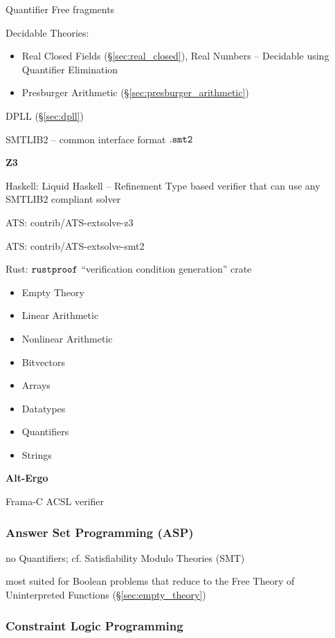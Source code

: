 Quantifier Free fragments

Decidable Theories: %
\begin{itemize}
  \item Real Closed Fields (\S\ref{sec:real_closed}), Real Numbers --
    Decidable using Quantifier Elimination
  \item Presburger Arithmetic (\S\ref{sec:presburger_arithmetic})
\end{itemize}

DPLL (\S\ref{sec:dpll})

SMTLIB2 -- common interface format $\mathtt{.smt2}$


\textbf{Z3}

Haskell: Liquid Haskell -- Refinement Type based verifier that can use
any SMTLIB2 compliant solver

ATS: contrib/ATS-extsolve-z3

ATS: contrib/ATS-extsolve-smt2

Rust: $\mathtt{rustproof}$ ``verification condition generation'' crate

\begin{itemize}
  \item Empty Theory
  \item Linear Arithmetic
  \item Nonlinear Arithmetic
  \item Bitvectors
  \item Arrays
  \item Datatypes
  \item Quantifiers
  \item Strings
\end{itemize}


\textbf{Alt-Ergo}

Frama-C ACSL verifier



\subsubsection{Answer Set Programming (ASP)}\label{sec:asp}

no Quantifiers; cf. Satisfiability Modulo Theories (SMT)

most suited for Boolean problems that reduce to the Free Theory of
Uninterpreted Functions (\S\ref{sec:empty_theory})



\subsubsection{Constraint Logic Programming}
\label{sec:constraint_logic_programming}

